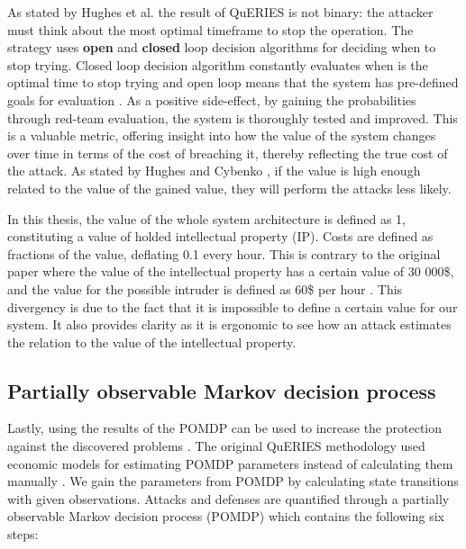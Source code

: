 As stated by Hughes et al. \cite{hughes2013quantitative} the result of QuERIES is not binary: the
attacker must think about the most optimal timeframe to stop the
operation. The strategy uses
\textbf{open} and \textbf{closed} loop decision algorithms for
deciding when to stop trying. Closed loop decision algorithm
constantly evaluates when is the optimal time to stop trying and open
loop means that the system has pre-defined goals for evaluation
\cite{carin2008cybersecurity}. As a positive side-effect, by gaining
the probabilities through red-team evaluation, the system is
thoroughly tested and improved. This is a valuable metric, offering
insight into how the value of the system changes over time in terms of
the cost of breaching it, thereby reflecting the true cost of the
attack. As stated by Hughes and Cybenko \cite{hughes2013quantitative}, if the value is high enough
related to the value of the gained value, they will
perform the attacks less likely.

In this thesis, the value of the whole system architecture is
defined as 1, constituting a value of holded intellectual
property (IP). Costs are defined as fractions of the value, deflating 
0.1 every hour. This is contrary to the original paper where the
value of the intellectual property has a certain value of 30 000\$, and
the value for the possible intruder is defined as 60\$ per hour
\cite{carin2008cybersecurity}. This divergency is due to the fact
that it is impossible to define a certain value for our system.
It also provides clarity as it is ergonomic to see how an attack
estimates the relation to the value of the intellectual property. 

\subsection{Partially observable Markov decision process}

Lastly, using the results of the POMDP can be used to increase the
protection against the discovered problems
\cite{carin2008cybersecurity}. The original QuERIES methodology used
economic models for estimating POMDP parameters instead of
calculating them manually \cite{carin2008cybersecurity}. We gain the
parameters from POMDP by calculating state transitions with given
observations. Attacks and defenses are quantified through a partially
observable Markov decision process (POMDP) which contains the following six
steps:

